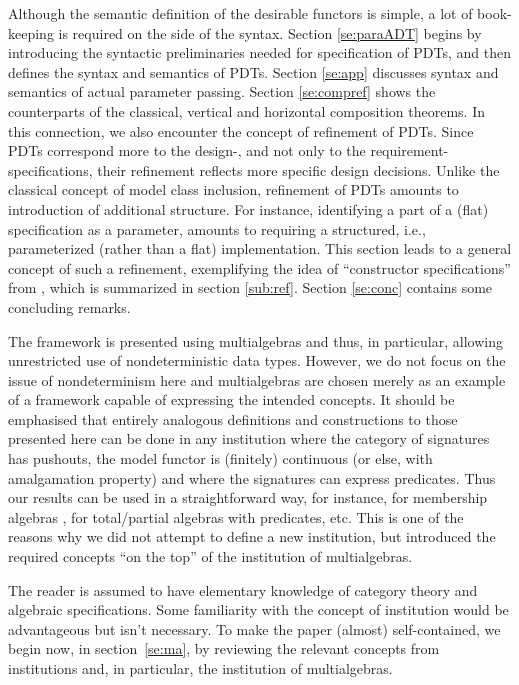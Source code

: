 Although the semantic definition of the desirable functors is simple, 
a lot of book-keeping is required on the side of the syntax. 
Section \ref{se:paraADT} begins by introducing the syntactic preliminaries
needed for specification of PDTs, and then defines the syntax and semantics
of PDTs. Section \ref{se:app} discusses syntax and semantics of actual
parameter passing. Section \ref{se:compref} shows the counterparts of the
classical, vertical and horizontal composition theorems. In this connection,
we also encounter the concept of refinement of PDTs. Since PDTs correspond
more to the design-, and not only to the requirement-specifications, their
refinement reflects more specific design decisions. Unlike the classical concept of
model class inclusion, refinement of PDTs amounts to introduction of additional
structure. For instance, identifying a part of a (flat)
specification as a parameter, amounts to requiring a structured, i.e.,
parameterized (rather than a flat) implementation. This section leads to a
general concept of such a refinement, exemplifying the idea of ``constructor
specifications'' from \cite{para1}, which is summarized in section \ref{sub:ref}.
Section \ref{se:conc} contains some concluding remarks.


The framework is presented using multialgebras \cite{calc,multi} and thus, in particular, allowing
unrestricted use of nondeterministic data types. However, we do not focus on the issue
of nondeterminism here and multialgebras are chosen merely as an example of a
framework capable of expressing the intended concepts. It should be
emphasised that entirely analogous definitions and constructions to those
presented here can be done in any institution where the category of
signatures has pushouts, the model functor is (finitely) continuous
(or else, with amalgamation property) and where the signatures
can express predicates. Thus our  results can be used in a
straightforward way, for instance, for membership algebras \cite{member}, 
for total/partial algebras with predicates, etc. This is one of the reasons
why we did not attempt to define a new institution, but introduced the
required concepts ``on the top'' of the institution of multialgebras. 

The
reader is assumed to have elementary knowledge of category theory and
algebraic specifications. Some
familiarity with the concept of institution would be advantageous but isn't necessary. To make
the paper (almost) self-contained, we
begin now, in section~\ref{se:ma}, by reviewing the relevant concepts from
institutions and, in particular, the institution of multialgebras.


